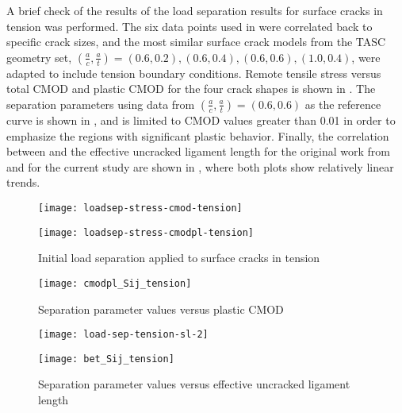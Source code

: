 A brief check of the results of the \citet{sharobeamlandes1993} load separation results for surface cracks in tension was performed.
The six data points used in  were correlated back to specific crack sizes, and the most similar surface crack models from the TASC geometry set, \((\frac{a}{c}, \frac{a}{t}) = (0.6, 0.2), (0.6, 0.4), (0.6, 0.6), (1.0, 0.4)\), were adapted to include tension boundary conditions.
Remote tensile stress versus total CMOD and plastic CMOD for the four crack shapes is shown in .
The separation parameters \Sij using data from \((\frac{a}{c}, \frac{a}{t}) = (0.6, 0.6)\) as the reference curve is shown in , and is limited to CMOD values greater than 0.01 in order to emphasize the regions with significant plastic behavior.
Finally, the correlation between \Sij and the effective uncracked ligament length for the original work from \citeauthor{sharobeamlandes1993} and for the current study are shown in , where both plots show relatively linear trends.
\begin{figure}[tbp]
\centering
\begin{minipage}{0.45\textwidth}
\texttt{[image: loadsep-stress-cmod-tension]}
\end{minipage}
\begin{minipage}{0.45\textwidth}
\texttt{[image: loadsep-stress-cmodpl-tension]}
\end{minipage}
\caption{\label{fig:stress-cmod-tension} Initial load separation applied to surface cracks in tension}
\end{figure}
\begin{figure}[tbp]
\centering
\texttt{[image: cmodpl\_Sij\_tension]}
\caption{\label{fig:sij_cmodpl} Separation parameter values versus plastic CMOD}
\end{figure}
\begin{figure}[tbp]
\centering
\begin{minipage}{0.45\textwidth}
\texttt{[image: load-sep-tension-sl-2]}
\end{minipage}
\begin{minipage}{0.45\textwidth}
\texttt{[image: bet\_Sij\_tension]}
\end{minipage}
\caption{\label{fig:sij_bet} Separation parameter values versus effective uncracked ligament length}
\end{figure}

